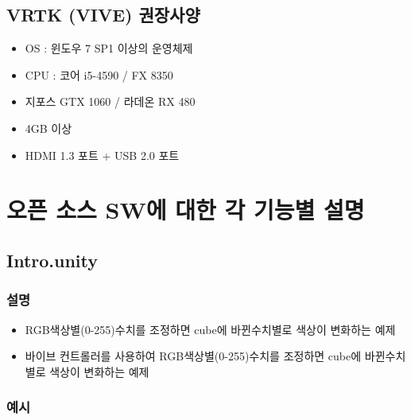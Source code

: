 \documentclass{report}
\begin{document}
    \section {VRTK (VIVE) 권장사양}
    
    \begin{itemize}
    
    \item OS : 윈도우 7 SP1 이상의 운영체제
    \item CPU : 코어 i5-4590 / FX 8350
    \item 지포스 GTX 1060 / 라데온 RX 480
    \item 4GB 이상
    \item HDMI 1.3 포트 + USB 2.0 포트

    \end{itemize}
    
    \chapter {오픈 소스 SW에 대한 각 기능별 설명}
    
    \section{Intro.unity}
    
    
    \subsection{설명}
    
    \begin{itemize}
    
    \item RGB색상별(0-255)수치를 조정하면 cube에 바뀐수치별로 색상이 변화하는 예제
    


    \end{itemize}
    
    \begin{itemize}
    

    \item 바이브 컨트롤러를 사용하여 RGB색상별(0-255)수치를 조정하면 cube에 바뀐수치별로 색상이 변화하는 예제
   

    \end{itemize}
    
    \subsection{예시}
    
\end{document}
